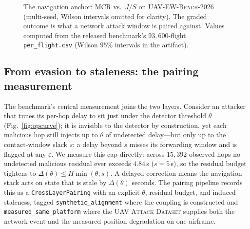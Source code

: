 \documentclass[conference]{IEEEtran}
\newcommand{\dataset}[1]{\textsc{#1}}
\newcommand{\code}[1]{\texttt{#1}}
\begin{document}
\begin{figure}[t]
\centering
{}
\caption{The navigation anchor: MCR vs.\ $J/S$ on \dataset{UAV-EW-Bench-2026}
(multi-seed, Wilson intervals omitted for clarity). The graded outcome is what a
network attack window is paired against. Values computed from the released
benchmark's $93{,}600$-flight \code{per\_flight.csv} (Wilson $95\%$ intervals in
the artifact).}
\label{fig:mcr}
\end{figure}

\subsection{From evasion to staleness: the pairing measurement}
The benchmark's central measurement joins the two layers. Consider an attacker
that tunes its per-hop delay to sit just under the detector threshold $\theta$
(Fig.~\ref{fig:opcurve}); it is invisible to the detector by construction, yet
each malicious hop still injects up to $\theta$ of undetected delay---but only up
to the contact-window slack $s$: a delay beyond $s$ misses its forwarding window
and is flagged at any $\varepsilon$. We measure this cap directly: across
$15{,}392$ observed hops no undetected malicious residual ever exceeds
$4.84$\,s ($s{=}5$\,s), so the residual budget tightens to
$\Delta(\theta)\!\le\!H\min(\theta,s)$. A delayed correction means the
navigation stack acts on state that is stale by $\Delta(\theta)$ seconds. The
pairing pipeline records
this as a \code{CrossLayerPairing} with an explicit $\theta$, residual budget,
and induced staleness, tagged \code{synthetic\_alignment} where the coupling is
constructed and \code{measured\_same\_platform} where the \dataset{UAV Attack
Dataset} supplies both the network event and the measured position degradation on
one airframe.
\end{document}
